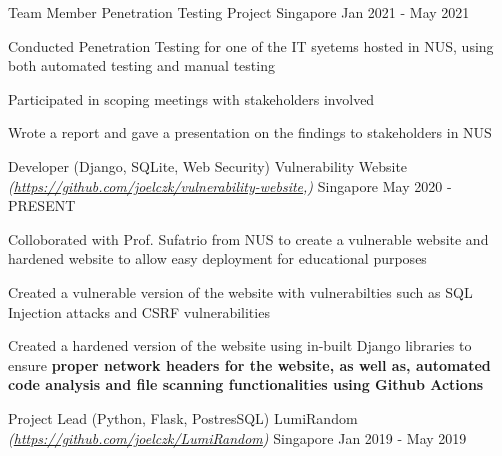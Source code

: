 

\begin{cventries}

  \cventry
  {Team Member} %
  {Penetration Testing Project} %
  {Singapore} %
  {Jan 2021 - May 2021} %
  {
    \begin{cvitems} %
      \item {Conducted Penetration Testing for one of the IT syetems hosted in NUS, using both automated testing and manual testing}
      \item {Participated in scoping meetings with stakeholders involved}
      \item {Wrote a report and gave a presentation on the findings to stakeholders in NUS}
    \end{cvitems}
  }
  \cventry
  {Developer (Django, SQLite, Web Security)} %
  {Vulnerability Website \textmd{\em\tiny(\url{https://github.com/joelczk/vulnerability-website},)}} %
  {Singapore} %
  {May 2020 - PRESENT} %
  {
    \begin{cvitems} %
      \item {Colloborated with Prof. Sufatrio from NUS to create a vulnerable website and hardened website to allow easy deployment for educational purposes}
      \item {Created a vulnerable version of the website with vulnerabilties such as SQL Injection attacks and CSRF vulnerabilities}
      \item {Created a hardened version of the website using in-built Django libraries to ensure \textbf{proper network headers for the website, as well as, automated code analysis and file scanning functionalities using Github Actions}}
    \end{cvitems}
  }
  \cventry
  {Project Lead (Python, Flask, PostresSQL)} %
  {LumiRandom \textmd{\em\tiny(\url{https://github.com/joelczk/LumiRandom})}} %
  {Singapore} %
  {Jan 2019 - May 2019} %

\end{cventries}
